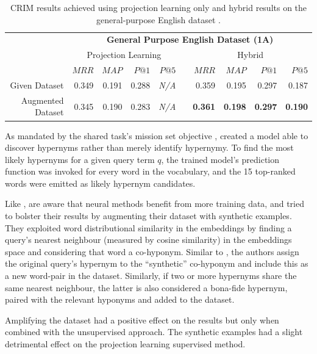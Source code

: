\begin{table}\centering
    \begin{tabular}{@{}rrrrrcrrrr@{}} \toprule
    & \multicolumn{9}{c}{\textbf{General Purpose English Dataset (1A)}} \\ \cmidrule{2-10} 
    & \multicolumn{4}{c}{Projection Learning} & \phantom{a} & \multicolumn{4}{c}{Hybrid} \\
    \cmidrule{2-5} \cmidrule{7-10}
    & $MRR$ & $MAP$ & $P@1$ & $P@5$ && $MRR$ & $MAP$ & $P@1$ & $P@5$ \\ \midrule
    Given Dataset & 0.349 & 0.191 & 0.288 & \textit{N/A} && 0.359 & 0.195 & 0.297 & 0.187 \\
    Augmented Dataset & 0.345 & 0.190 & 0.283 & \textit{N/A} && \textbf{0.361} & \textbf{0.198} & \textbf{0.297} & \textbf{0.190} \\
    \bottomrule
    \end{tabular}
    \caption{\ac{CRIM} results achieved using projection learning only and hybrid results on the general-purpose English dataset \citep{bernier2018crim}.}\label{tab:CRIM_results}
\end{table}

As mandated by the shared task's mission set objective \citep{camacho2018semeval}, \citep{bernier2018crim} created a model able to discover hypernyms rather than merely identify hypernymy.  To find the most likely hypernyms for a given query term $q$, the trained model's prediction function was invoked for every word in the vocabulary, and the 15 top-ranked words were emitted as likely hypernym candidates.

Like \citep{espinosa2016supervised}, \citeauthor{bernier2018crim} are aware that neural methods benefit from more training data, and tried to bolster their results by augmenting their dataset with synthetic examples.  They exploited word distributional similarity in the embeddings by finding a query’s nearest neighbour (measured by cosine similarity) in the embeddings space and considering that word a co-hyponym.  Similar to \citep{Snow2004, ritter2009anyway}, the authors assign the original query’s hypernym to the “synthetic” co-hyponym and include this as a new word-pair in the dataset.  Similarly, if two or more hypernyms share the same nearest neighbour, the latter is also considered a bona-fide hypernym, paired with the relevant hyponyms and added to the dataset.  

Amplifying the dataset had a positive effect on the results but only when combined with the unsupervised approach.  The synthetic examples had a slight detrimental effect on the projection learning supervised method.

